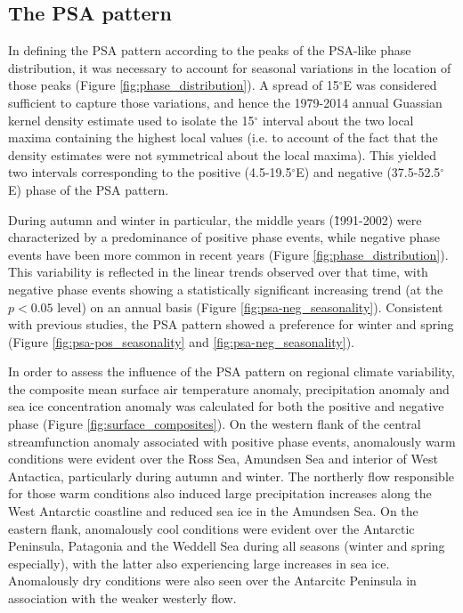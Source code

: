 \subsection{The PSA pattern}

In defining the PSA pattern according to the peaks of the PSA-like phase distribution, it was necessary to account for seasonal variations in the location of those peaks (Figure \ref{fig:phase_distribution}). A spread of 15$^{\circ}$E was considered sufficient to capture those variations, and hence the 1979-2014 annual Guassian kernel density estimate used to isolate the 15$^{\circ}$ interval about the two local maxima containing the highest local values (i.e. to account of the fact that the density estimates were not symmetrical about the local maxima). This yielded two intervals corresponding to the positive (4.5-19.5$^{\circ}$E) and negative (37.5-52.5$^{\circ}$E) phase of the PSA pattern.

During autumn and winter in particular, the middle years (\~1991-2002) were characterized by a predominance of positive phase events, while negative phase events have been more common in recent years (Figure \ref{fig:phase_distribution}). This variability is reflected in the linear trends observed over that time, with negative phase events showing a statistically significant increasing trend (at the $p < 0.05$ level) on an annual basis (Figure \ref{fig:psa-neg_seasonality}). Consistent with previous studies, the PSA pattern showed a preference for winter and spring (Figure \ref{fig:psa-pos_seasonality} and \ref{fig:psa-neg_seasonality}).

In order to assess the influence of the PSA pattern on regional climate variability, the composite mean surface air temperature anomaly, precipitation anomaly and sea ice concentration anomaly was calculated for both the positive and negative phase (Figure \ref{fig:surface_composites}). On the western flank of the central streamfunction anomaly associated with positive phase events, anomalously warm conditions were evident over the Ross Sea, Amundsen Sea and interior of West Antactica, particularly during autumn and winter. The northerly flow responsible for those warm conditions also induced large precipitation increases along the West Antarctic coastline and reduced sea ice in the Amundsen Sea. On the eastern flank, anomalously cool conditions were evident over the Antarctic Peninsula, Patagonia and the Weddell Sea during all seasons (winter and spring especially), with the latter also experiencing large increases in sea ice. Anomalously dry conditions were also seen over the Antarcitc Peninsula in association with the weaker westerly flow. 

